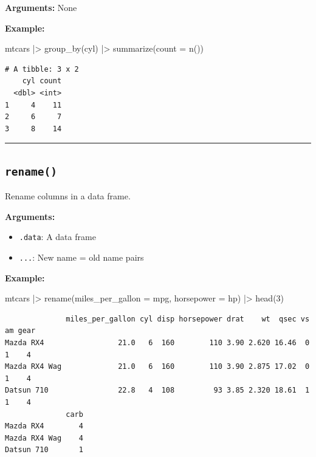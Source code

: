 \documentclass[
  letterpaper,
  DIV=11,
  numbers=noendperiod]{scrreprt}
\newenvironment{Shaded}{\begin{snugshade}}{\end{snugshade}}
\newcommand{\AttributeTok}[1]{\textcolor[rgb]{0.40,0.45,0.13}{#1}}
\newcommand{\DecValTok}[1]{\textcolor[rgb]{0.68,0.00,0.00}{#1}}
\newcommand{\FunctionTok}[1]{\textcolor[rgb]{0.28,0.35,0.67}{#1}}
\newcommand{\NormalTok}[1]{\textcolor[rgb]{0.00,0.23,0.31}{#1}}
\newcommand{\SpecialCharTok}[1]{\textcolor[rgb]{0.37,0.37,0.37}{#1}}
\providecommand{\tightlist}{%
  \setlength{\itemsep}{0pt}\setlength{\parskip}{0pt}}
\begin{document}
\textbf{Arguments:} None

\textbf{Example:}

\begin{Shaded}
\begin{Highlighting}[]
\NormalTok{mtcars }\SpecialCharTok{|\textgreater{}}
  \FunctionTok{group\_by}\NormalTok{(cyl) }\SpecialCharTok{|\textgreater{}}
  \FunctionTok{summarize}\NormalTok{(}\AttributeTok{count =} \FunctionTok{n}\NormalTok{())}
\end{Highlighting}
\end{Shaded}

\begin{verbatim}
# A tibble: 3 x 2
    cyl count
  <dbl> <int>
1     4    11
2     6     7
3     8    14
\end{verbatim}

\begin{center}\rule{0.5\linewidth}{0.5pt}\end{center}

\subsection{\texorpdfstring{\texttt{rename()}}{rename()}}\label{rename}

Rename columns in a data frame.

\textbf{Arguments:}

\begin{itemize}
\tightlist
\item
  \texttt{.data}: A data frame
\item
  \texttt{...}: New name = old name pairs
\end{itemize}

\textbf{Example:}

\begin{Shaded}
\begin{Highlighting}[]
\NormalTok{mtcars }\SpecialCharTok{|\textgreater{}}
  \FunctionTok{rename}\NormalTok{(}\AttributeTok{miles\_per\_gallon =}\NormalTok{ mpg, }\AttributeTok{horsepower =}\NormalTok{ hp) }\SpecialCharTok{|\textgreater{}}
  \FunctionTok{head}\NormalTok{(}\DecValTok{3}\NormalTok{)}
\end{Highlighting}
\end{Shaded}

\begin{verbatim}
              miles_per_gallon cyl disp horsepower drat    wt  qsec vs am gear
Mazda RX4                 21.0   6  160        110 3.90 2.620 16.46  0  1    4
Mazda RX4 Wag             21.0   6  160        110 3.90 2.875 17.02  0  1    4
Datsun 710                22.8   4  108         93 3.85 2.320 18.61  1  1    4
              carb
Mazda RX4        4
Mazda RX4 Wag    4
Datsun 710       1
\end{verbatim}
\end{document}
